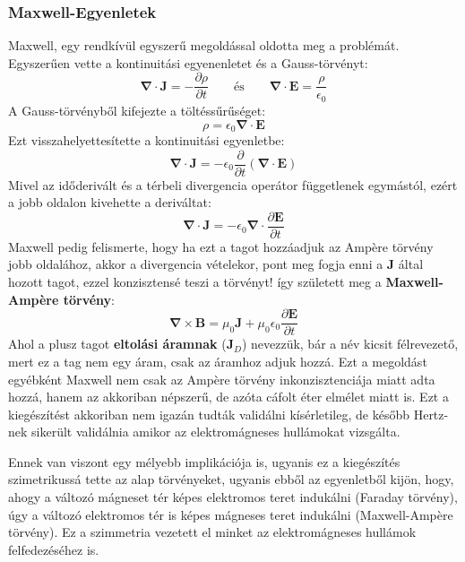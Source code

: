 \documentclass[../main.tex]{subfiles}
\begin{document}
\subsubsection{Maxwell-Egyenletek}
Maxwell, egy rendkívül egyszerű megoldással oldotta meg a problémát. Egyszerűen vette a kontinuitási egyenenletet és a Gauss-törvényt:
\begin{equation}
    \boldsymbol{\nabla} \cdot \mathbf{J} = - \frac{\partial \rho}{\partial t} \qquad \text{és} \qquad \boldsymbol{\nabla} \cdot \mathbf{E} = \frac{\rho}{\epsilon_0}
\end{equation}
A Gauss-törvényből kifejezte a töltéssűrűséget:
\begin{equation}
    \rho = \epsilon_0 \boldsymbol{\nabla} \cdot \mathbf{E}
\end{equation}
Ezt visszahelyettesítette a kontinuitási egyenletbe:
\begin{equation}
    \boldsymbol{\nabla} \cdot \mathbf{J} = - \epsilon_0 \frac{\partial }{\partial t} (\boldsymbol{\nabla} \cdot \mathbf{E})
\end{equation}
Mivel az időderivált és a térbeli divergencia operátor függetlenek egymástól, ezért a jobb oldalon kivehette a deriváltat:
\begin{equation}
    \boldsymbol{\nabla} \cdot \mathbf{J} = - \epsilon_0 \boldsymbol{\nabla} \cdot \frac{\partial \mathbf{E}}{\partial t}
\end{equation}
Maxwell pedig felismerte, hogy ha ezt a tagot hozzáadjuk az Ampère törvény jobb oldalához, akkor a divergencia vételekor, pont meg fogja enni a $\mathbf{J}$ által hozott tagot, ezzel konzisztensé teszi a törvényt!
így született meg a \textbf{Maxwell-Ampère törvény}:
\begin{equation}
    \boldsymbol{\nabla} \times \mathbf{B} = \mu_0 \mathbf{J} + \mu_0 \epsilon_0 \frac{\partial \mathbf{E}}{\partial t}
\end{equation}
Ahol a plusz tagot \textbf{eltolási áramnak} ($\mathbf{J}_D$) nevezzük, bár a név kicsit félrevezető, mert ez a tag nem egy áram, csak az áramhoz adjuk hozzá.
Ezt a megoldást egyébként Maxwell nem csak az Ampère törvény inkonzisztenciája miatt adta hozzá, hanem az akkoriban népszerű, de azóta cáfolt éter elmélet miatt is.
Ezt a kiegészítést akkoriban nem igazán tudták validálni kísérletileg, de később Hertz-nek sikerült validálnia amikor az elektromágneses hullámokat vizsgálta.

Ennek van viszont egy mélyebb implikációja is, ugyanis ez a kiegészítés szimetrikussá tette az alap törvényeket, ugyanis ebből az egyenletből kijön, hogy, ahogy a változó mágneset tér képes elektromos teret
indukálni (Faraday törvény), úgy a változó elektromos tér is képes mágneses teret indukálni (Maxwell-Ampère törvény). Ez a szimmetria vezetett el minket az elektromágneses hullámok felfedezéséhez is.
\end{document}
